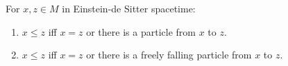 For $x, z \in M$ in Einstein-de Sitter spacetime:
\begin{enumerate}
  \item[(c)] $x \leq z$ iff $x = z$ or there is a particle from $x$ to $z$.
  \item[(d)] $x \leq z$ iff $x = z$ or there is a freely falling particle from $x$ to $z$.
\end{enumerate}
